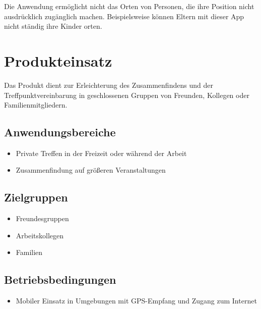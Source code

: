 \documentclass[parskip=full,11pt]{scrartcl}
\begin{document}
Die Anwendung ermöglicht nicht das Orten von Personen,
die ihre Position nicht ausdrücklich zugänglich machen.
Beispielsweise können Eltern mit dieser App nicht ständig ihre Kinder orten.

\pagebreak
\section{Produkteinsatz}
Das Produkt dient zur Erleichterung des Zusammenfindens und der
Treffpunktvereinbarung in geschlossenen Gruppen von Freunden, Kollegen oder
Familienmitgliedern.

\subsection{Anwendungsbereiche}
\begin{itemize}
    \item Private Treffen in der Freizeit oder während der Arbeit
    \item Zusammenfindung auf größeren Veranstaltungen
\end{itemize}

\subsection{Zielgruppen}
\begin{itemize}
    \item Freundesgruppen
    \item Arbeitskollegen
    \item Familien
\end{itemize}

\subsection{Betriebsbedingungen}
\begin{itemize}
    \item Mobiler Einsatz in Umgebungen mit GPS-Empfang und Zugang zum Internet
\end{itemize}
\end{document}
